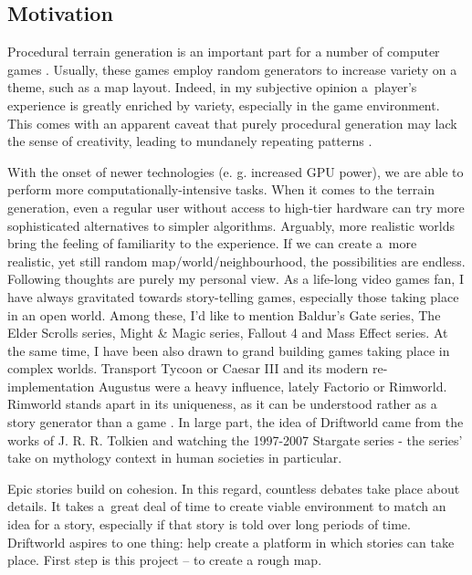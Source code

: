 \subsection{Motivation}
\label{subsec:motivation}
Procedural terrain generation is an important part for a number of computer games \cite{generatedgames}. Usually, these games employ random generators to increase variety on a theme, such as a map layout. Indeed, in my subjective opinion a~player's experience is greatly enriched by variety, especially in the game environment. This comes with an apparent caveat that purely procedural generation may lack the sense of creativity, leading to mundanely repeating patterns \cite{daggerfall}. 

With the onset of newer technologies (e. g. increased GPU power), we are able to perform more computationally-intensive tasks. When it comes to the terrain generation, even a regular user without access to high-tier hardware can try more sophisticated alternatives to simpler algorithms. Arguably, more realistic worlds bring the feeling of familiarity to the experience. If we can create a~more realistic, yet still random map/world/neighbourhood, the possibilities are endless.
\newpage
Following thoughts are purely my personal view. As a life-long video games fan, I have always gravitated towards story-telling games, especially those taking place in an open world. Among these, I'd like to mention Baldur's Gate series, The Elder Scrolls series, Might \& Magic series, Fallout 4 and Mass Effect series. At the same time, I have been also drawn to grand building games taking place in complex worlds. Transport Tycoon or Caesar III and its modern re-implementation Augustus \cite{augustus} were a heavy influence, lately Factorio or Rimworld. Rimworld stands apart in its uniqueness, as it can be understood rather as a story generator than a game \cite{rimworld}. In large part, the idea of Driftworld came from the works of J. R. R. Tolkien and watching the 1997-2007 Stargate series - the series' take on mythology context in human societies in particular.

Epic stories build on cohesion. In this regard, countless debates take place about details. It takes a~great deal of time to create viable environment to match an idea for a story, especially if that story is told over long periods of time. Driftworld aspires to one thing: help create a platform in which stories can take place. First step is this project -- to create a rough map. 
